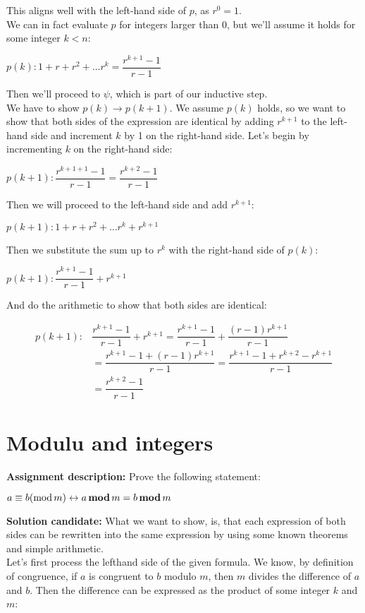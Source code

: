\documentclass{report}
\newcommand{\cent}[1]{\begin{center}#1\end{center}}
\newcommand{\mAlign}[1]{\begin{align*}#1\end{align*}}
\newcommand{\assignmentDescription}{\textbf{Assignment description: }}
\newcommand{\solution}{\textbf{Solution candidate: }}
\newcommand{\QED}{\boxed{}}
\newcommand{\modInline}{\text{mod\,}}
\newcommand{\modFunc}{\text{\,\textbf{mod}\,}}
\begin{document}
 	This aligns well with the left-hand side of $p$, as $r^0 = 1$.\\
 	
 	We can in fact evaluate $p$ for integers larger than 0, but we'll assume it holds for some integer $k < n$:
 	
 	\cent{$p(k) : 1 + r + r^2 + \dots r^k = \dfrac{r^{k+1} - 1}{r-1}$}
 	
 	Then we'll proceed to $\psi$, which is part of our inductive step.\\
 	
 	We have to show $p(k) \to p(k+1)$. We assume $p(k)$ holds, so we want to show that both sides of the expression are identical by adding $r^{k+1}$ to the left-hand side and increment $k$ by 1 on the right-hand side. Let's begin by incrementing $k$ on the right-hand side:
 	
 	\cent{$p(k+1) : \dfrac{r^{k+1+1} - 1}{r-1} = \dfrac{r^{k+2} - 1}{r-1}$}
 	
 	Then we will proceed to the left-hand side and add $r^{k+1}$:
 	
 	\cent{$p(k+1) : 1 + r + r^2 + \dots r^k + r^{k+1} $}
 	
 	Then we substitute the sum up to $r^k$ with the right-hand side of  $p(k)$:
 	
 	\cent{$p(k+1) : \dfrac{r^{k+1} - 1}{r-1} + r^{k+1} $}
 	
 	And do the arithmetic to show that both sides are identical:
 	
 	\mAlign{
 		p(k+1) : &\dfrac{r^{k+1} - 1}{r-1} + r^{k+1} = \dfrac{r^{k+1} - 1}{r-1} + \dfrac{(r-1)r^{k+1}}{r-1} \\
 		&=  \dfrac{r^{k+1} - 1 + (r-1)r^{k+1}}{r-1} = \dfrac{r^{k+1} - 1 + r^{k+2} -r^{k+1}}{r-1} \\
 		&= \dfrac{ r^{k+2}-1}{r-1}
 	}
 	
 	\QED
 	\section{Modulu and integers}
 	\assignmentDescription Prove the following statement:
 	\cent{$a \equiv b (\modInline m) \leftrightarrow a \modFunc m = b \modFunc m$}
 	
 	\solution
 	What we want to show, is, that each expression of both sides can be rewritten into  the same expression by using some known theorems and simple arithmetic.\\
 	
 	Let's first process the lefthand side of the given formula. We know, by definition of congruence, if $a$ is congruent to $b$ modulo $m$, then $m$ divides the difference of $a$ and $b$. Then the difference can be expressed as the product of some integer $k$ and $m$:
 	
\end{document}
